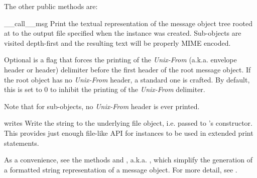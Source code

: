 The other public  methods are:

\begin{methoddesc}[Generator]{__call__}{msg}
Print the textual representation of the message object tree rooted at
 to the output file specified when the 
instance was created.  Sub-objects are visited depth-first and the
resulting text will be properly MIME encoded.

Optional  is a flag that forces the printing of the
\emph{Unix-From} (a.k.a. envelope header or  header)
delimiter before the first  header of the root message
object.  If the root object has no \emph{Unix-From} header, a standard
one is crafted.  By default, this is set to 0 to inhibit the printing
of the \emph{Unix-From} delimiter.

Note that for sub-objects, no \emph{Unix-From} header is ever printed.
\end{methoddesc}

\begin{methoddesc}[Generator]{write}{s}
Write the string  to the underlying file object,
i.e.  passed to 's constructor.  This
provides just enough file-like API for  instances to
be used in extended print statements.
\end{methoddesc}

As a convenience, see the methods  and
, a.k.a. , which
simplify the generation of a formatted string representation of a
message object.  For more detail, see .
